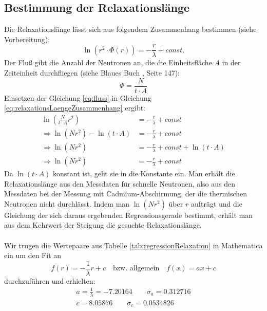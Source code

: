 \documentclass[a4paper,titlepage]{scrartcl}
\numberwithin{equation}{section}
\begin{document}
\subsection{Bestimmung der Relaxationslänge}
\label{subsec:relaxation}
Die Relaxationslänge lässt sich aus folgendem Zusammenhang bestimmen (siehe Vorbereitung):
\begin{equation}
\label{eq:relaxationsLaengeZusammenhang}
\ln{(r^2 \cdot \Phi (r))}=-\frac{r}{\lambda} + const.
\end{equation}
Der Fluß gibt die Anzahl der Neutronen an, die die Einheitsfläche $A$ in der Zeiteinheit durchfliegen (siehe Blaues Buch \cite{blauesBuch}, Seite 147):
\begin{equation}
\label{eq:fluss}
\Phi=\frac{N}{t \cdot A}
\end{equation}
Einsetzen der Gleichung \ref{eq:fluss} in Gleichung \ref{eq:relaxationsLaengeZusammenhang} ergibt:
\begin{align}
\ln{\left(\frac{N}{t \cdot A} r^2\right)}&=-\frac{r}{\lambda}+const \nonumber \\
\Rightarrow \ln{(N r^2)}-\ln{(t \cdot A)}&=-\frac{r}{\lambda}+const \nonumber \\
\Rightarrow \ln{(N r^2)}&=-\frac{r}{\lambda}+const+\ln{(t \cdot A)} \nonumber \\
\Rightarrow \ln{(N r^2)}&=-\frac{r}{\lambda}+const \label{eq:regressionRelaxation}
\end{align}
Da $\ln{(t \cdot A)}$ konstant ist, geht sie in die Konstante ein. Man erhält die Relaxationslänge aus den Messdaten für schnelle Neutronen, also aus den Messdaten bei der Messung mit Cadmium-Abschirmung, der die thermischen Neutronen nicht durchlässt. Indem man $\ln{(N r^2)}$ über $r$ aufträgt und die Gleichung der sich daraus ergebenden Regressionsgerade bestimmt, erhält man aus dem Kehrwert der Steigung die gesuchte Relaxationslänge.\\ \\
Wir trugen die Wertepaare aus Tabelle \ref{tab:regressionRelaxation} in Mathematica ein um den Fit an
\begin{equation*}
f(r)=-\frac{1}{\lambda}r + c \quad \text{bzw. allgemein} \quad f(x)=ax + c
\end{equation*}
durchzuführen und erhielten:
\begin{eqnarray*}
a=\frac{1}{\lambda}=-7.20164 \quad \quad \sigma_a=0.312716\\
c=8.05876 \quad \quad \sigma_c=0.0534826
\end{eqnarray*}
\end{document}
